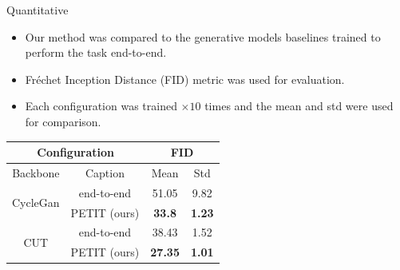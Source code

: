 \begin{frame}{Quantitative}
    \begin{itemize}
      \item Our method was compared to the generative models baselines trained to perform the task end-to-end.
      \item Fréchet Inception Distance (FID) \cite{DBLP:journals/corr/HeuselRUNKH17} metric was used for evaluation.
      \item Each configuration was trained $\times 10$ times and the mean and std were used for comparison.
    \end{itemize}
    \begin{table}
        \centering
        \begin{tabular}{| c  c  || c  c |}
            \multicolumn{2}{c}{Configuration} & \multicolumn{2}{c}{FID} \\
            \hline
            Backbone & Caption & Mean & Std\\
            \hline
            \multirow{2}{4em}{CycleGan}  & end-to-end    & 51.05             & 9.82\\      
                                         & PETIT (ours)       & \textbf{33.8}     & \textbf{1.23}\\
            \hline
            \multirow{2}{4em}{CUT}       & end-to-end    & 38.43             & 1.52\\
                                         & PETIT (ours)       & \textbf{27.35}    & \textbf{1.01}\\
            \hline
        \end{tabular}
    \end{table}    
\end{frame}

